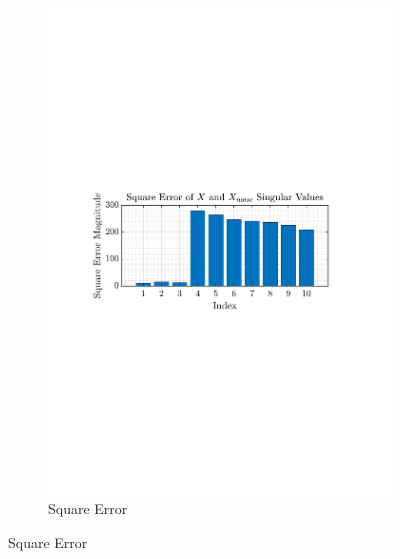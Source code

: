 \documentclass[12pt]{article}
\begin{document}
\begin{figure}[H]
\begin{subfigure}{0.49\textwidth}
			\includegraphics[trim={2.2cm 11.2cm 3.15cm  11.2cm}, clip, width=\textwidth]{../MATLAB/figures/q1_6a_fig02.pdf} 
			\captionsetup{justification=centering}
			\caption{Square Error}
		\end{subfigure}
		\label{fig: 1-6a}
	\end{figure}
 
\end{document}
